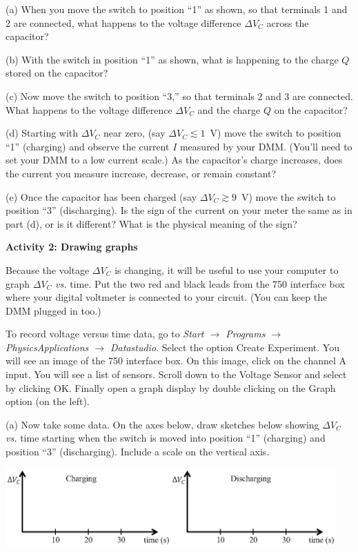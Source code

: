(a) When you move the switch to position ``1'' as shown, so that terminals 1 and 2 are connected, what happens to the voltage difference $\Delta V_C$ across the capacitor?
\answerspace{0.6in}

(b)  With the switch in position ``1'' as shown, what is happening to the charge $Q$ stored on the capacitor?
\answerspace{0.6in}

(c)  Now move the switch to position ``3,'' so that terminals 2 and 3 are connected.  What happens to the voltage difference $\Delta V_C$ and the charge $Q$ on the capacitor?
\answerspace{0.7in}

\pagebreak[2]
(d) Starting with $\Delta V_C$ near zero, (say $\Delta V_C \lesssim 1$~V) move the switch to position ``1'' (charging) and observe the current $I$ measured by your DMM.  (You'll need to set your DMM to a low current scale.)  As the capacitor's charge increases, does the current you measure increase, decrease, or remain constant?
\answerspace{0.5in}

(e) Once the capacitor has been charged (say $\Delta V_C \gtrsim 9$~V) move the switch to position ``3'' (discharging).  Is the sign of the current on your meter the same as in part (d), or is it different?  What is the physical meaning of the sign?
\answerspace{0.7in}

\textbf{Activity 2: Drawing graphs}

Because the voltage $\Delta V_C$ is changing, it will be useful to use your computer to graph $\Delta V_C$ \textit{vs.} time.  Put the two red and black leads from the 750 interface box where your digital voltmeter is connected to your circuit.  (You can keep the DMM plugged in too.)

To record voltage versus time data, go to \textit{Start $\longrightarrow$ Programs $\longrightarrow$ PhysicsApplications $\longrightarrow$ Datastudio}. Select the option Create Experiment.  You will see an image of the 750 interface box.  On this image, click on the channel A input.  You will see a list of sensors.  Scroll down to the Voltage Sensor and select by clicking OK.  Finally open a graph display by double clicking on the Graph option (on the left).

(a)  Now take some data.  On the axes below, draw sketches below showing $\Delta V_C$ \textit{vs.} time starting when the switch is moved into position ``1'' (charging) and position ``3'' (discharging).  Include a scale on the vertical axis.

\begin{center}
\vspace{-0.4 in}
\includegraphics[width=0.95\textwidth]{rc_circuits/vc_axes.eps}
\vspace{-0.1 in}
\end{center}

